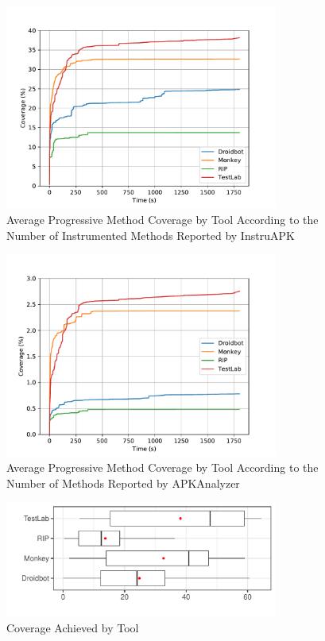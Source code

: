 \begin{figure}[h]
\centering
\includegraphics[width=0.8\textwidth]{../Figures/averageCoverageInstruAPK.pdf}
\caption{Average Progressive Method Coverage by Tool According to the Number of Instrumented Methods Reported by InstruAPK}\label{fig:averageCoverageInstruAPK}
\end{figure}

\begin{figure}[h]
\centering
\includegraphics[width=0.8\textwidth]{../Figures/averageCoverageAPKAnalyzer.pdf}
\caption{Average Progressive Method Coverage by Tool According to the Number of Methods Reported by APKAnalyzer}\label{fig:averageCoverageAPKAnalyzer}
\end{figure}

\begin{figure}[h]
\centering
\includegraphics[width=0.8\textwidth]{../Figures/boxplotAccumulated.pdf}
\caption{Coverage Achieved by Tool}\label{fig:boxplotAccumulated}
\end{figure}


